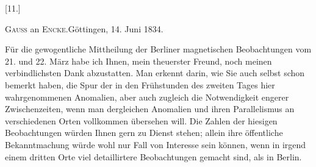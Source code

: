 \clearpage\begingroup{}
\begin{center}[11.]\end{center}
\begin{center}\textsc{Gauss} an \textsc{Encke}.\quad Göttingen, 14. Juni 1834.\end{center}
\noindent\hspace*{\parindent}Für die gewogentliche Mittheilung der Berliner magnetischen Beobachtungen
vom 21. und 22. März habe ich Ihnen, mein theuerster Freund, noch
meinen verbindlichsten Dank abzustatten. Man erkennt darin, wie Sie auch
selbst schon bemerkt haben, die Spur der in den Frühstunden des zweiten
Tages hier wahrgenommenen Anomalien, aber auch zugleich die Notwendigkeit
 engerer Zwischenzeiten, wenn man dergleichen Anomalien und ihren
Parallelismus an verschiedenen Orten vollkommen übersehen will. Die Zahlen
der hiesigen Beobachtungen würden Ihnen gern zu Dienst stehen; allein
ihre öffentliche Bekanntmachung würde wohl nur  Fall von Interesse
sein können, wenn in irgend einem dritten Orte viel detaillirtere Beobachtungen
gemacht sind, als in Berlin.

